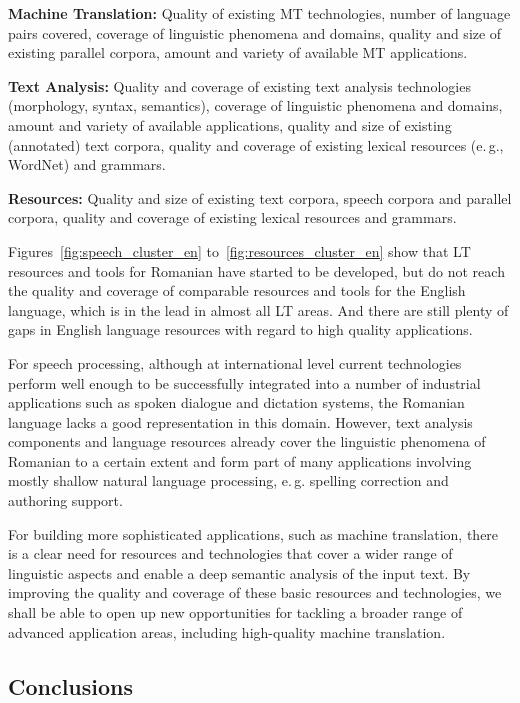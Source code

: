 \begin{multicols}{2}
\textbf{Machine Translation:} Quality of existing MT technologies, number of language pairs covered, coverage of linguistic phenomena and domains, quality and size of existing parallel corpora, amount and variety of available MT applications.

\textbf{Text Analysis:} Quality and coverage of existing text analysis technologies (morphology, syntax, semantics), coverage of linguistic phenomena and domains, amount and variety of available applications, quality and size of existing (annotated) text corpora, quality and coverage of existing lexical resources (e.\,g., WordNet) and grammars.

\textbf{Resources:} Quality and size of existing text corpora, speech corpora and parallel corpora, quality and coverage of existing lexical resources and grammars.

Figures~\ref{fig:speech_cluster_en} to~\ref{fig:resources_cluster_en} show that LT resources and tools for Romanian have started to be developed, but do not reach the quality and coverage of comparable resources and tools for the English language, which is in the lead in almost all LT areas. And there are still plenty of gaps in English language resources with regard to high quality applications.

For speech processing, although at international level current technologies perform well enough to be successfully integrated into a number of industrial applications such as spoken dialogue and dictation systems, the Romanian language lacks a good representation in this domain. However, text analysis components and language resources already cover the linguistic phenomena of Romanian to a certain extent and form part of many applications involving mostly shallow natural language processing, e.\,g. spelling correction and authoring support.

For building more sophisticated applications, such as machine translation, there is a clear need for resources and technologies that cover a wider range of linguistic aspects and enable a deep semantic analysis of the input text. By improving the quality and coverage of these basic resources and technologies, we shall be able to open up new opportunities for tackling a broader range of advanced application areas, including high-quality machine translation.

\subsection{Conclusions}



\end{multicols}
